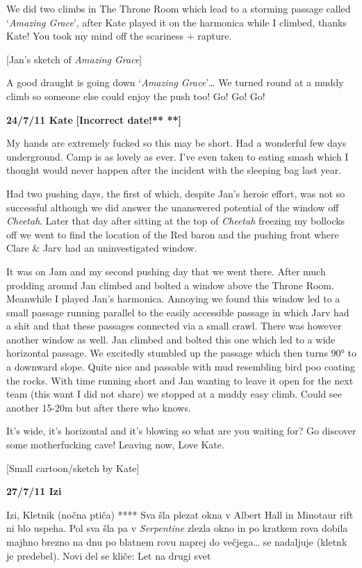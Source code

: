 We did two climbs in The Throne Room which lead to a storming passage
called `\emph{Amazing Grace}', after Kate played it on the harmonica
while I climbed, thanks Kate! You took my mind off the scariness +
rapture.

{[}Jan's sketch of \emph{Amazing Grace}{]}

A good draught is going down `\emph{Amazing Grace}'\ldots{} We turned
round at a muddy climb so someone else could enjoy the push too! Go! Go!
Go!

\textbf{24/7/11 Kate} \textbf{{[}Incorrect date!** **{]}}

My hands are extremely fucked so this may be short. Had a wonderful few
days underground. Camp is as lovely as ever. I've even taken to eating
smash which I thought would never happen after the incident with the
sleeping bag last year.

Had two pushing days, the first of which, despite Jan's heroic effort,
was not so successful although we did answer the unanswered potential of
the window off \emph{Cheetah}. Later that day after sitting at the top
of \emph{Cheetah} freezing my bollocks off we went to find the location
of the Red baron and the pushing front where Clare \& Jarv had an
uninvestigated window.

It was on Jam and my second pushing day that we went there. After much
prodding around Jan climbed and bolted a window above the Throne Room.
Meanwhile I played Jan's harmonica. Annoying we found this window led to
a small passage running parallel to the easily accessible passage in
which Jarv had a shit and that these passages connected via a small
crawl. There was however another window as well. Jan climbed and bolted
this one which led to a wide horizontal passage. We excitedly stumbled
up the passage which then turns 90° to a downward slope. Quite nice and
passable with mud resembling bird poo coating the rocks. With time
running short and Jan wanting to leave it open for the next team (this
want I did not share) we stopped at a muddy easy climb. Could see
another 15-20m but after there who knows.

It's wide, it's horizontal and it's blowing so what are you waiting for?
Go discover some motherfucking cave! Leaving now, Love Kate.

{[}Small cartoon/sketch by Kate{]}

\textbf{27/7/11 Izi}

Izi, Kletnik (nočna ptiča) **** Sva šla plezat okna v Albert Hall in
Minotaur rift ni blo uspeha. Pol sva šla pa v \emph{Serpentine} zlezla
okno in po kratkem rova dobila majhno brezno na dnu po blatnem rovu
naprej do večjega\ldots{} se nadaljuje (kletnk je predebel). Novi del se
kliče: Let na drugi svet

